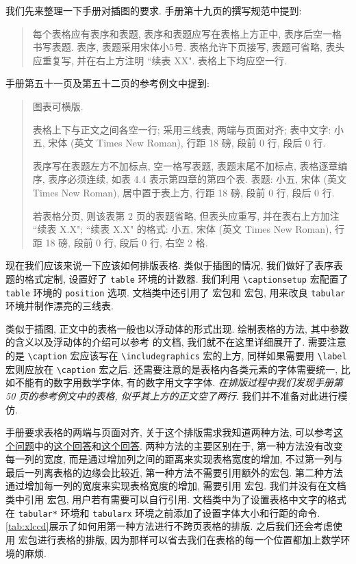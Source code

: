 我们先来整理一下手册对插图的要求. 手册第十九页的撰写规范中提到:
\begin{quote}
  每个表格应有表序和表题, 表序和表题应写在表格上方正中, 表序后空一格书写表题. 表序, 表题采用宋体小5号. 表格允许下页接写, 表题可省略, 表头应重复写, 并在右上方注明 {``\songti\upshape 续表 XX"}. 表格上下均应空一行.
\end{quote}
手册第五十一页及第五十二页的参考例文中提到:
\begin{quote}
  图表可横版.

  表格上下与正文之间各空一行;
  采用三线表, 两端与页面对齐;
  表中文字: 小五, 宋体 (英文 Times New Roman), 行距 18 磅, 段前 0 行, 段后 0 行.

  表序写在表题左方不加标点, 空一格写表题, 表题末尾不加标点, 表格逐章编序, 表序必须连续, 如表 4.4 表示第四章的第四个表. 表题: 小五, 宋体 (英文 Times New Roman), 居中置于表上方, 行距 18 磅, 段前 0 行, 段后 0 行.

  若表格分页, 则该表第 2 页的表题省略, 但表头应重写, 并在表右上方加注 ``续表 X.X";
  ``续表 X.X" 的格式: 小五, 宋体 (英文 Times New Roman), 行距 18 磅, 段前 0 行, 段后 0 行, 右空 2 格.
\end{quote}

现在我们应该来说一下应该如何排版表格. 类似于插图的情况, 我们做好了表序表题的格式定制, 设置好了 \verb|table| 环境的计数器. 我们利用 \verb|\captionsetup| 宏配置了 \verb|table| 环境的 \verb|position| 选项. 文档类中还引用了  宏包和  宏包, 用来改良 \verb|tabular| 环境并制作漂亮的三线表.

类似于插图, 正文中的表格一般也以浮动体的形式出现. 绘制表格的方法, 其中参数的含义以及浮动体的介绍可以参考  的文档, 我们就不在这里详细展开了. 需要注意的是 \verb|\caption| 宏应该写在 \verb|\includegraphics| 宏的上方, 同样如果需要用 \verb|\label| 宏则应放在 \verb|\caption| 宏之后. 还需要注意的是表格内各类元素的字体需要统一, 比如不能有的数字用数学字体, 有的数字用文字字体. \emph{在排版过程中我们发现手册第 50 页的参考例文中的表格, 似乎其上方的正文空了两行.} 我们并不准备对此进行模仿.

手册要求表格的两端与页面对齐, 关于这个排版需求我知道两种方法, 可以参考\href{https://tex.stackexchange.com/questions/10535}{这个问题}中的\href{https://tex.stackexchange.com/a/56552}{这个回答}和\href{https://tex.stackexchange.com/a/10540}{这个回答}. 两种方法的主要区别在于, 第一种方法没有改变每一列的宽度, 而是通过增加列之间的距离来实现表格宽度的增加, 不过第一列与最后一列离表格的边缘会比较近, 第一种方法不需要引用额外的宏包. 第二种方法通过增加每一列的宽度来实现表格宽度的增加, 需要引用  宏包. 我们并没有在文档类中引用  宏包, 用户若有需要可以自行引用. 文档类中为了设置表格中文字的格式在 \verb|tabular*| 环境和 \verb|tabularx| 环境之前添加了设置字体大小和行距的命令. \ref{tab:xlccd}展示了如何用第一种方法进行不跨页表格的排版. 之后我们还会考虑使用  宏包进行表格的排版, 因为那样可以省去我们在表格的每一个位置都加上数学环境的麻烦.

